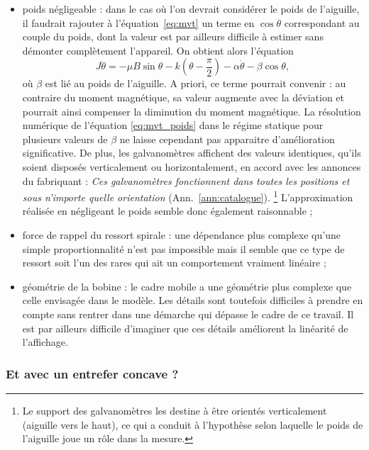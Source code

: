 \documentclass[12pt,a4paper,fleqn]{article}
\begin{document}
\begin{itemize}
\item poids négligeable : dans le cas où l'on devrait considérer le poids de l'aiguille, il faudrait rajouter à l'équation~\ref{eq:mvt} un terme en $\cos\theta$ correspondant au couple du poids, dont la valeur est par ailleurs difficile à estimer sans démonter complètement l'appareil.
On obtient alors l'équation 
\begin{equation}
J\ddot{\theta} = -\mu B \sin \theta - k\left(\theta-\frac{\pi}{2}\right) - \alpha\dot{\theta} - \beta \cos\theta,
\label{eq:mvt_poids}
\end{equation}
où $\beta$ est lié au poids de l'aiguille.
A priori, ce terme pourrait convenir : au contraire du moment magnétique, sa valeur augmente avec la déviation et pourrait ainsi compenser la diminution du moment magnétique.
La résolution numérique de l'équation \ref{eq:mvt_poids} dans le régime statique pour plusieurs valeurs de $\beta$ ne laisse cependant pas apparaitre d'amélioration significative.
De plus, les galvanomètres affichent des valeurs identiques, qu'ils soient disposés verticalement ou horizontalement, en accord avec les annonces du fabriquant : \og \emph{Ces galvanomètres fonctionnent dans toutes les positions et sous n'importe quelle orientation} \fg{} (Ann.~\ref{ann:catalogue}). 
\footnote{Le support des galvanomètres les destine à être orientés verticalement (aiguille vers le haut), ce qui a conduit à l'hypothèse selon laquelle le poids de l'aiguille joue un rôle dans la mesure.}
L'approximation réalisée en négligeant le poids semble donc également raisonnable ;

\item force de rappel du ressort spirale : une dépendance plus complexe qu'une simple proportionnalité n'est pas impossible mais il semble que ce type de ressort soit l'un des rares qui ait un \og comportement vraiment linéaire \fg{} \cite{wiki_ressort} ;

\item géométrie de la bobine : le cadre mobile a une géométrie plus complexe que celle envisagée dans le modèle.
Les détails sont toutefois difficiles à prendre en compte sans rentrer dans une démarche qui dépasse le cadre de ce travail.
Il est par ailleurs difficile d'imaginer que ces détails améliorent la linéarité de l'affichage.
\end{itemize}

\subsubsection{Et avec un entrefer concave ?}
\end{document}
